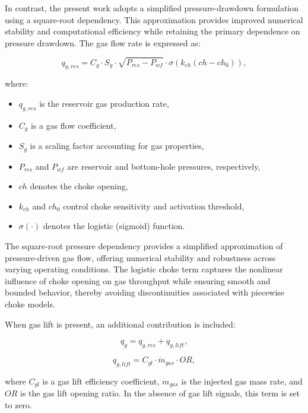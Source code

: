 \documentclass[12pt,APA]{uomthesis}
\begin{document}
In contrast, the present work adopts a simplified pressure-drawdown formulation using a square-root dependency. This approximation provides improved numerical stability and computational efficiency while retaining the primary dependence on pressure drawdown. The gas flow rate is expressed as:

\begin{equation}
q_{g,res} = C_g \cdot S_g \cdot \sqrt{P_{res} - P_{wf}} \cdot \sigma\!\left(k_{ch}(ch - ch_0)\right),
\end{equation}

where:
\begin{itemize}
    \item $q_{g,res}$ is the reservoir gas production rate,
    \item $C_g$ is a gas flow coefficient,
    \item $S_g$ is a scaling factor accounting for gas properties,
    \item $P_{res}$ and $P_{wf}$ are reservoir and bottom-hole pressures, respectively,
    \item $ch$ denotes the choke opening,
    \item $k_{ch}$ and $ch_0$ control choke sensitivity and activation threshold,
    \item $\sigma(\cdot)$ denotes the logistic (sigmoid) function.
\end{itemize}

The square-root pressure dependency provides a simplified approximation of pressure-driven gas flow, offering numerical stability and robustness across varying operating conditions. The logistic choke term captures the nonlinear influence of choke opening on gas throughput while ensuring smooth and bounded behavior, thereby avoiding discontinuities associated with piecewise choke models.

When gas lift is present, an additional contribution is included:

\begin{equation}
q_g = q_{g,res} + q_{g,lift},
\end{equation}

\begin{equation}
q_{g,lift} = C_{gl} \cdot \dot{m}_{gas} \cdot OR,
\end{equation}

where $C_{gl}$ is a gas lift efficiency coefficient, $\dot{m}_{gas}$ is the injected gas mass rate, and $OR$ is the gas lift opening ratio. In the absence of gas lift signals, this term is set to zero.
\end{document}
